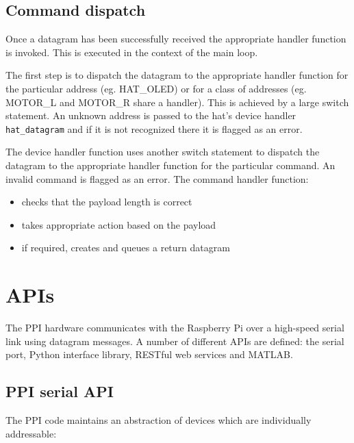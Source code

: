 \documentclass[11pt,fleqn]{article}
\begin{document}
\subsection{Command dispatch}
Once a datagram has been successfully received the appropriate handler function is invoked.  This is executed in the context of the main loop.

The first step is to dispatch the 
datagram to the appropriate  handler function for the particular address (eg. HAT\_OLED) or for a class of addresses (eg. MOTOR\_L and MOTOR\_R share a handler).  This is achieved by a large switch statement.  An unknown address is passed to the hat's device handler \texttt{hat\_datagram} and if it is not recognized there it is flagged as an error.

The device handler function uses another switch statement to dispatch the datagram to the appropriate handler function for the particular command.
 An invalid command is flagged as an error.
 The command handler function:
 \begin{itemize}
 \item checks that the payload length is correct
 \item takes appropriate action based on the payload
 \item if required, creates and queues a return datagram
 \end{itemize}

\section{APIs}
The PPI hardware communicates with the Raspberry Pi over a high-speed serial link using datagram messages.  A number of different
APIs are defined: the serial port, Python interface library, RESTful web services and MATLAB.

\subsection{PPI serial API}

The PPI code maintains an abstraction of devices which are individually addressable:
\end{document}
